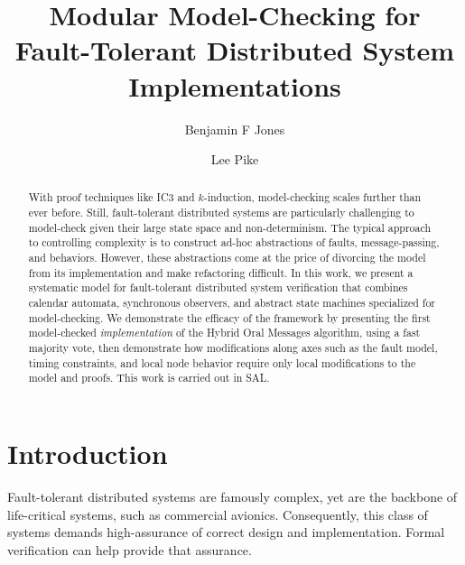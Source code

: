 \documentclass{llncs/llncs}
\newcommand{\lee}[1]{ } %
\newcommand{\lee}[1]{ {\color{blue}$<$lee: #1$>$} } %
\begin{document}
\title{Modular Model-Checking for Fault-Tolerant Distributed System Implementations}

\author{Benjamin F Jones \and Lee Pike}




\maketitle


\begin{abstract}
With proof techniques like IC3 and $k$-induction, model-checking scales further
than ever before.  Still, fault-tolerant distributed systems are particularly
challenging to model-check given their large state space and
non-determinism. The typical approach to controlling complexity is to construct
ad-hoc abstractions of faults, message-passing, and behaviors.  However, these
abstractions come at the price of divorcing the model from its implementation
and make refactoring difficult. In this work, we present a systematic model for
fault-tolerant distributed system verification that combines calendar automata,
synchronous observers, and abstract state machines specialized for
model-checking. We demonstrate the efficacy of the framework by presenting the
first model-checked \emph{implementation} of the Hybrid Oral Messages algorithm,
using a fast majority vote, then demonstrate how modifications along axes such
as the fault model, timing constraints, and local node behavior require only local modifications
to the model and proofs. This work is carried out in SAL.
\end{abstract}

\lee{grep to get consistent manifest/benign, also lieutenant vs relay/receiver.}

\section{Introduction}

\lee{talk about Amazon/TLA? Paxos made live?}

Fault-tolerant distributed systems are famously complex, yet are the backbone of life-critical systems, such as commercial avionics. Consequently, this class of systems demands high-assurance of correct design and implementation. Formal verification can help provide that assurance.
\end{document}
